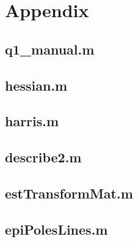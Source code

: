 \documentclass[a4paper, 10pt, conference]{ieeeconf}
\begin{document}
\section*{Appendix}

\subsection*{q1\_manual.m}

\newpage

\subsection*{hessian.m}

\newpage

\subsection*{harris.m}

\newpage

\subsection*{describe2.m}

\newpage

\subsection*{estTransformMat.m}

\newpage

\subsection*{epiPolesLines.m}

\newpage
\end{document}
